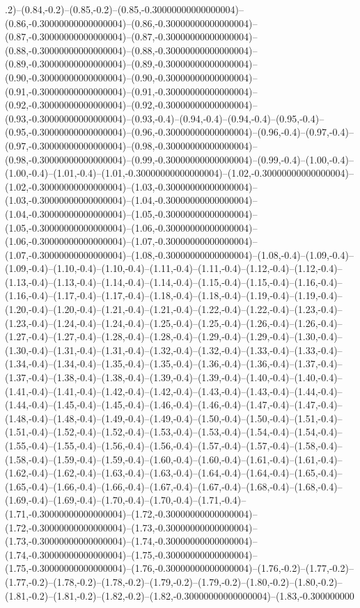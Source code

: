 .2)--(0.84,-0.2)--(0.85,-0.2)--(0.85,-0.30000000000000004)--(0.86,-0.30000000000000004)--(0.86,-0.30000000000000004)--(0.87,-0.30000000000000004)--(0.87,-0.30000000000000004)--(0.88,-0.30000000000000004)--(0.88,-0.30000000000000004)--(0.89,-0.30000000000000004)--(0.89,-0.30000000000000004)--(0.90,-0.30000000000000004)--(0.90,-0.30000000000000004)--(0.91,-0.30000000000000004)--(0.91,-0.30000000000000004)--(0.92,-0.30000000000000004)--(0.92,-0.30000000000000004)--(0.93,-0.30000000000000004)--(0.93,-0.4)--(0.94,-0.4)--(0.94,-0.4)--(0.95,-0.4)--(0.95,-0.30000000000000004)--(0.96,-0.30000000000000004)--(0.96,-0.4)--(0.97,-0.4)--(0.97,-0.30000000000000004)--(0.98,-0.30000000000000004)--(0.98,-0.30000000000000004)--(0.99,-0.30000000000000004)--(0.99,-0.4)--(1.00,-0.4)--(1.00,-0.4)--(1.01,-0.4)--(1.01,-0.30000000000000004)--(1.02,-0.30000000000000004)--(1.02,-0.30000000000000004)--(1.03,-0.30000000000000004)--(1.03,-0.30000000000000004)--(1.04,-0.30000000000000004)--(1.04,-0.30000000000000004)--(1.05,-0.30000000000000004)--(1.05,-0.30000000000000004)--(1.06,-0.30000000000000004)--(1.06,-0.30000000000000004)--(1.07,-0.30000000000000004)--(1.07,-0.30000000000000004)--(1.08,-0.30000000000000004)--(1.08,-0.4)--(1.09,-0.4)--(1.09,-0.4)--(1.10,-0.4)--(1.10,-0.4)--(1.11,-0.4)--(1.11,-0.4)--(1.12,-0.4)--(1.12,-0.4)--(1.13,-0.4)--(1.13,-0.4)--(1.14,-0.4)--(1.14,-0.4)--(1.15,-0.4)--(1.15,-0.4)--(1.16,-0.4)--(1.16,-0.4)--(1.17,-0.4)--(1.17,-0.4)--(1.18,-0.4)--(1.18,-0.4)--(1.19,-0.4)--(1.19,-0.4)--(1.20,-0.4)--(1.20,-0.4)--(1.21,-0.4)--(1.21,-0.4)--(1.22,-0.4)--(1.22,-0.4)--(1.23,-0.4)--(1.23,-0.4)--(1.24,-0.4)--(1.24,-0.4)--(1.25,-0.4)--(1.25,-0.4)--(1.26,-0.4)--(1.26,-0.4)--(1.27,-0.4)--(1.27,-0.4)--(1.28,-0.4)--(1.28,-0.4)--(1.29,-0.4)--(1.29,-0.4)--(1.30,-0.4)--(1.30,-0.4)--(1.31,-0.4)--(1.31,-0.4)--(1.32,-0.4)--(1.32,-0.4)--(1.33,-0.4)--(1.33,-0.4)--(1.34,-0.4)--(1.34,-0.4)--(1.35,-0.4)--(1.35,-0.4)--(1.36,-0.4)--(1.36,-0.4)--(1.37,-0.4)--(1.37,-0.4)--(1.38,-0.4)--(1.38,-0.4)--(1.39,-0.4)--(1.39,-0.4)--(1.40,-0.4)--(1.40,-0.4)--(1.41,-0.4)--(1.41,-0.4)--(1.42,-0.4)--(1.42,-0.4)--(1.43,-0.4)--(1.43,-0.4)--(1.44,-0.4)--(1.44,-0.4)--(1.45,-0.4)--(1.45,-0.4)--(1.46,-0.4)--(1.46,-0.4)--(1.47,-0.4)--(1.47,-0.4)--(1.48,-0.4)--(1.48,-0.4)--(1.49,-0.4)--(1.49,-0.4)--(1.50,-0.4)--(1.50,-0.4)--(1.51,-0.4)--(1.51,-0.4)--(1.52,-0.4)--(1.52,-0.4)--(1.53,-0.4)--(1.53,-0.4)--(1.54,-0.4)--(1.54,-0.4)--(1.55,-0.4)--(1.55,-0.4)--(1.56,-0.4)--(1.56,-0.4)--(1.57,-0.4)--(1.57,-0.4)--(1.58,-0.4)--(1.58,-0.4)--(1.59,-0.4)--(1.59,-0.4)--(1.60,-0.4)--(1.60,-0.4)--(1.61,-0.4)--(1.61,-0.4)--(1.62,-0.4)--(1.62,-0.4)--(1.63,-0.4)--(1.63,-0.4)--(1.64,-0.4)--(1.64,-0.4)--(1.65,-0.4)--(1.65,-0.4)--(1.66,-0.4)--(1.66,-0.4)--(1.67,-0.4)--(1.67,-0.4)--(1.68,-0.4)--(1.68,-0.4)--(1.69,-0.4)--(1.69,-0.4)--(1.70,-0.4)--(1.70,-0.4)--(1.71,-0.4)--(1.71,-0.30000000000000004)--(1.72,-0.30000000000000004)--(1.72,-0.30000000000000004)--(1.73,-0.30000000000000004)--(1.73,-0.30000000000000004)--(1.74,-0.30000000000000004)--(1.74,-0.30000000000000004)--(1.75,-0.30000000000000004)--(1.75,-0.30000000000000004)--(1.76,-0.30000000000000004)--(1.76,-0.2)--(1.77,-0.2)--(1.77,-0.2)--(1.78,-0.2)--(1.78,-0.2)--(1.79,-0.2)--(1.79,-0.2)--(1.80,-0.2)--(1.80,-0.2)--(1.81,-0.2)--(1.81,-0.2)--(1.82,-0.2)--(1.82,-0.30000000000000004)--(1.83,-0.300000000